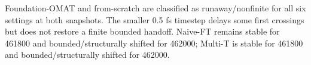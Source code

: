 Foundation-OMAT and from-scratch are classified as runaway/nonfinite for all six settings at both snapshots. The smaller 0.5 fs timestep delays some first crossings but does not restore a finite bounded handoff. Naive-FT remains stable for 461800 and bounded/structurally shifted for 462000; Multi-T is stable for 461800 and bounded/structurally shifted for 462000.
